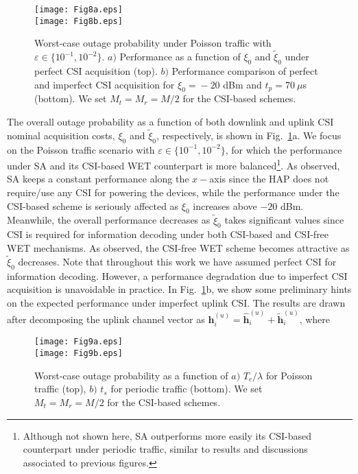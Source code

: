\documentclass[10pt,journal,a4paper]{IEEEtran}
\begin{document}
	\begin{figure}[t!]
		\texttt{[image: Fig8a.eps]}\vspace{3mm}\\
		\texttt{[image: Fig8b.eps]}
		\caption{Worst-case outage probability under Poisson traffic with $\varepsilon\in\{10^{-1},10^{-2}\}$. $a)$ Performance as a function of $\xi_0$ and $\tilde{\xi}_0$ under perfect CSI acquisition (top). $b)$ Performance comparison of perfect and imperfect CSI acquisition for $\xi_0\!=\!-20$ dBm and $t_p=70\ \mu$s (bottom).  We set $M_t=M_r=M/2$ for the CSI-based schemes.}		
		\label{Fig8}
	\end{figure}
	The overall outage probability as a function of both downlink and uplink CSI nominal acquisition costs, $\xi_0$ and $\tilde{\xi}_0$, respectively, is shown in Fig.~\ref{Fig8}a. We focus on the Poisson traffic scenario with $\varepsilon\in\{10^{-1},10^{-2}\}$, for which the performance under SA and its CSI-based WET counterpart is more balanced\footnote{Although not shown here, SA outperforms more easily its CSI-based counterpart under periodic traffic, similar to results and discussions associated to previous figures.}. As observed, SA keeps a constant performance along the $x-$axis since the HAP does not require/use any CSI for powering the devices, while the performance under the CSI-based scheme is seriously affected as $\xi_0$ increases above $-20$ dBm. Meanwhile, the overall performance decreases as $\tilde{\xi}_0$ takes significant values since CSI is required for information decoding under both CSI-based and CSI-free WET mechanisms. As observed, the CSI-free WET scheme becomes attractive as $\tilde{\xi}_0$ decreases. Note that throughout this work we have assumed perfect CSI for information decoding. However, a performance degradation due to imperfect CSI acquisition is unavoidable in practice. In Fig.~\ref{Fig8}b, we show some preliminary hints on the expected performance under imperfect uplink CSI. The results are drawn after decomposing the uplink channel vector as $\mathbf{h}_i^{(u)}=\mathbf{\hat{h}}_i^{(u)}+\mathbf{\tilde{h}}_i^{(u)}$, where
		\begin{figure}[t!]
			\texttt{[image: Fig9a.eps]}\vspace{3mm}\\ 
			\texttt{[image: Fig9b.eps]}
			\caption{Worst-case outage probability as a function of $a)$ $T_c/\lambda$ for Poisson traffic (top),  $b)$ $t_s$ for periodic traffic (bottom). We set $M_t=M_r=M/2$ for the CSI-based schemes.}
			\label{Fig9}
		\end{figure}
\end{document}
